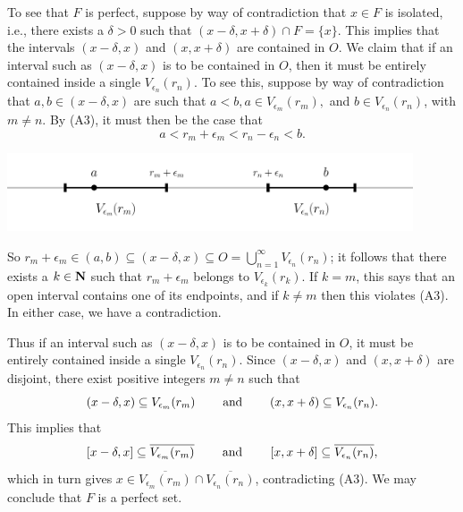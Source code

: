 \documentclass{lew98_solutions}
\begin{document}
\begin{solution}
\begin{enumerate}
        To see that \( F \) is perfect, suppose by way of contradiction that \( x \in F \) is isolated, i.e., there exists a \( \delta > 0 \) such that \( (x - \delta, x + \delta) \cap F = \{ x \} \). This implies that the intervals \( (x - \delta, x) \) and \( (x, x + \delta) \) are contained in \( O \). We claim that if an interval such as \( (x - \delta, x) \) is to be contained in \( O \), then it must be entirely contained inside a single \( V_{\epsilon_n}(r_n) \). To see this, suppose by way of contradiction that \( a, b \in (x - \delta, x) \) are such that \( a < b, a \in V_{\epsilon_m}(r_m), \) and \( b \in V_{\epsilon_n}(r_n) \), with \( m \neq n \). By (A3), it must then be the case that
        \[
            a < r_m + \epsilon_m < r_n - \epsilon_n < b.
        \]
        \begin{center}
            \includegraphics[width=0.9\textwidth]{UA_Figures/UA_ex3_4_9_fig_2.pdf}
        \end{center}
        So \( r_m + \epsilon_m \in (a, b) \subseteq (x - \delta, x) \subseteq O = \bigcup_{n=1}^{\infty} V_{\epsilon_n}(r_n) \); it follows that there exists a \( k \in \N \) such that \( r_m + \epsilon_m \) belongs to \( V_{\epsilon_k}(r_k) \). If \( k = m \), this says that an open interval contains one of its endpoints, and if \( k \neq m \) then this violates (A3). In either case, we have a contradiction.

        Thus if an interval such as \( (x - \delta, x) \) is to be contained in \( O \), it must be entirely contained inside a single \( V_{\epsilon_n}(r_n) \). Since \( (x - \delta, x) \) and \( (x, x + \delta) \) are disjoint, there exist positive integers \( m \neq n \) such that
        \[
            (x - \delta, x) \subseteq V_{\epsilon_m}(r_m) \hspaceand (x, x + \delta) \subseteq V_{\epsilon_n}(r_n).
        \]
        This implies that
        \[
            [x - \delta, x] \subseteq \overline{V_{\epsilon_m}(r_m)} \hspaceand[8mm] [x, x + \delta] \subseteq \overline{V_{\epsilon_n}(r_n)},
        \]
        which in turn gives \( x \in \overline{V_{\epsilon_m}(r_m)} \cap \overline{V_{\epsilon_n}(r_n)} \), contradicting (A3). We may conclude that \( F \) is a perfect set.
    \end{enumerate}
\end{solution}
\end{document}
